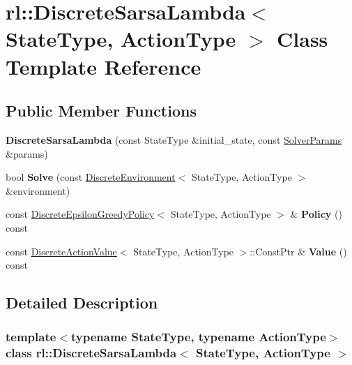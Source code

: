 \hypertarget{classrl_1_1_discrete_sarsa_lambda}{}\section{rl\+:\+:Discrete\+Sarsa\+Lambda$<$ State\+Type, Action\+Type $>$ Class Template Reference}
\label{classrl_1_1_discrete_sarsa_lambda}
\subsection*{Public Member Functions}
\begin{DoxyCompactItemize}
\item 
\hypertarget{classrl_1_1_discrete_sarsa_lambda_aab5a458bbbfb8c30b26fa82059e1fb40}{}\label{classrl_1_1_discrete_sarsa_lambda_aab5a458bbbfb8c30b26fa82059e1fb40} 
{\bfseries Discrete\+Sarsa\+Lambda} (const State\+Type \&initial\+\_\+state, const \hyperlink{structrl_1_1_solver_params}{Solver\+Params} \&params)
\item 
\hypertarget{classrl_1_1_discrete_sarsa_lambda_a622e3b6761479b7487a57c730d522ca3}{}\label{classrl_1_1_discrete_sarsa_lambda_a622e3b6761479b7487a57c730d522ca3} 
bool {\bfseries Solve} (const \hyperlink{classrl_1_1_discrete_environment}{Discrete\+Environment}$<$ State\+Type, Action\+Type $>$ \&environment)
\item 
\hypertarget{classrl_1_1_discrete_sarsa_lambda_af6d5b91b1b9c27d11e299fff4e500e25}{}\label{classrl_1_1_discrete_sarsa_lambda_af6d5b91b1b9c27d11e299fff4e500e25} 
const \hyperlink{classrl_1_1_discrete_epsilon_greedy_policy}{Discrete\+Epsilon\+Greedy\+Policy}$<$ State\+Type, Action\+Type $>$ \& {\bfseries Policy} () const
\item 
\hypertarget{classrl_1_1_discrete_sarsa_lambda_af91b01cb52337403254f2c16d8aed706}{}\label{classrl_1_1_discrete_sarsa_lambda_af91b01cb52337403254f2c16d8aed706} 
const \hyperlink{structrl_1_1_discrete_action_value}{Discrete\+Action\+Value}$<$ State\+Type, Action\+Type $>$\+::Const\+Ptr \& {\bfseries Value} () const
\end{DoxyCompactItemize}


\subsection{Detailed Description}
\subsubsection*{template$<$typename State\+Type, typename Action\+Type$>$\newline
class rl\+::\+Discrete\+Sarsa\+Lambda$<$ State\+Type, Action\+Type $>$}



